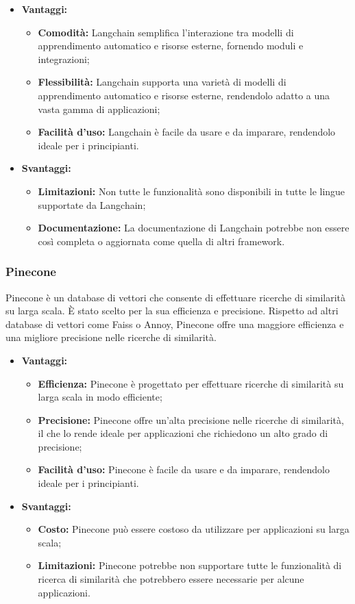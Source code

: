 \documentclass[10pt, a4paper]{article}
\begin{document}
\begin{itemize}
\item \textbf{Vantaggi:}
\begin{itemize}
\item \textbf{Comodità:} Langchain semplifica l'interazione tra modelli di apprendimento automatico e risorse esterne, fornendo moduli e integrazioni;
\item \textbf{Flessibilità:} Langchain supporta una varietà di modelli di apprendimento automatico e risorse esterne, rendendolo adatto a una vasta gamma di applicazioni;
\item \textbf{Facilità d'uso:} Langchain è facile da usare e da imparare, rendendolo ideale per i principianti.
\end{itemize}
\item \textbf{Svantaggi:}
\begin{itemize}
\item \textbf{Limitazioni:} Non tutte le funzionalità sono disponibili in tutte le lingue supportate da Langchain;
\item \textbf{Documentazione:} La documentazione di Langchain potrebbe non essere così completa o aggiornata come quella di altri framework.
\end{itemize}
\end{itemize}

\subsubsection{Pinecone}
Pinecone è un database di vettori che consente di effettuare ricerche di similarità su larga scala. È stato scelto per la sua efficienza e precisione. Rispetto ad altri database di vettori come Faiss o Annoy, Pinecone offre una maggiore efficienza e una migliore precisione nelle ricerche di similarità.

\begin{itemize}
\item \textbf{Vantaggi:}
\begin{itemize}
\item \textbf{Efficienza:} Pinecone è progettato per effettuare ricerche di similarità su larga scala in modo efficiente;
\item \textbf{Precisione:} Pinecone offre un'alta precisione nelle ricerche di similarità, il che lo rende ideale per applicazioni che richiedono un alto grado di precisione;
\item \textbf{Facilità d'uso:} Pinecone è facile da usare e da imparare, rendendolo ideale per i principianti.
\end{itemize}
\item \textbf{Svantaggi:}
\begin{itemize}
\item \textbf{Costo:} Pinecone può essere costoso da utilizzare per applicazioni su larga scala;
\item \textbf{Limitazioni:} Pinecone potrebbe non supportare tutte le funzionalità di ricerca di similarità che potrebbero essere necessarie per alcune applicazioni.
\end{itemize}
\end{itemize}
\end{document}
